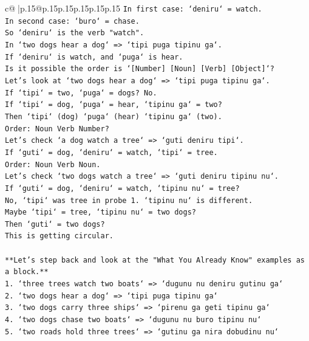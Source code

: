\documentclass{article}
\begin{document}
{\begin{supertabular}{c@{$\;$}|p{.15\linewidth}@{}p{.15\linewidth}p{.15\linewidth}p{.15\linewidth}p{.15\linewidth}p{.15\linewidth}}
{{{\texttt{In first case: `deniru` = watch.} \\
\texttt{In second case: `buro` = chase.} \\
\texttt{So `deniru` is the verb "watch".} \\
\texttt{In `two dogs hear a dog` => `tipi puga tipinu ga`.} \\
\texttt{If `deniru` is watch, and `puga` is hear.} \\
\texttt{Is it possible the order is `{[}Number{]} {[}Noun{]} {[}Verb{]} {[}Object{]}`?} \\
\texttt{Let's look at `two dogs hear a dog` => `tipi puga tipinu ga`.} \\
\texttt{If `tipi` = two, `puga` = dogs? No.} \\
\texttt{If `tipi` = dog, `puga` = hear, `tipinu ga` = two?} \\
\texttt{Then `tipi` (dog) `puga` (hear) `tipinu ga` (two).} \\
\texttt{Order: Noun Verb Number?} \\
\texttt{Let's check `a dog watch a tree` => `guti deniru tipi`.} \\
\texttt{If `guti` = dog, `deniru` = watch, `tipi` = tree.} \\
\texttt{Order: Noun Verb Noun.} \\
\texttt{Let's check `two dogs watch a tree` => `guti deniru tipinu nu`.} \\
\texttt{If `guti` = dog, `deniru` = watch, `tipinu nu` = tree?} \\
\texttt{No, `tipi` was tree in probe 1. `tipinu nu` is different.} \\
\texttt{Maybe `tipi` = tree, `tipinu nu` = two dogs?} \\
\texttt{Then `guti` = two dogs?} \\
\texttt{This is getting circular.} \\
\\ 
\texttt{**Let's step back and look at the "What You Already Know" examples as a block.**} \\
\texttt{1. `three trees watch two boats` => `dugunu nu deniru gutinu ga`} \\
\texttt{2. `two dogs hear a dog` => `tipi puga tipinu ga`} \\
\texttt{3. `two dogs carry three ships` => `pirenu ga geti tipinu ga`} \\
\texttt{4. `two dogs chase two boats` => `dugunu nu buro tipinu nu`} \\
\texttt{5. `two roads hold three trees` => `gutinu ga nira dobudinu nu`} \\
}}}
\end{supertabular}}
\end{document}
